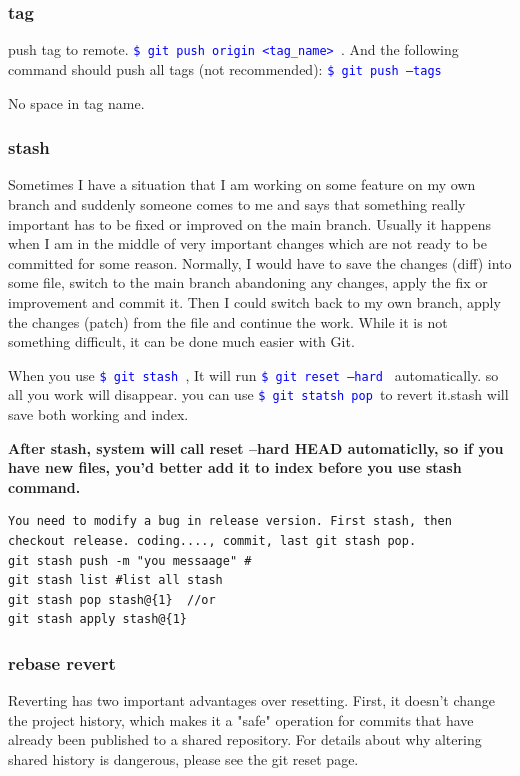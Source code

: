 \documentclass[paper=8.5in:11in, twoside, 12pt, pagesize=pdftex]{book}
\newcommand{\linuxcommand}[1]{\texttt{\textcolor{blue}{\$ #1 \Pisymbol{psy}{191}}}}
\begin{document}
\subsubsection{tag}
push tag to remote. \linuxcommand{git push origin <tag\_name>}. And the following command should push all tags (not recommended): \linuxcommand{git push --tags}

No space in tag name.
\subsubsection{stash}

	Sometimes I have a situation that I am working on some feature on my own branch and suddenly someone comes to me and says that something really important has to be fixed or improved on the main branch. Usually it happens when I am in the middle of very important changes which are not ready to be committed for some reason. Normally, I would have to save the changes (diff) into some file, switch to the main branch abandoning any changes, apply the fix or improvement and commit it. Then I could switch back to my own branch, apply the changes (patch) from the file and continue the work. While it is not something difficult, it can be done much easier with Git.
	
	When you use \linuxcommand{git stash}, It will run \linuxcommand{git reset --hard} automatically. so all you work will disappear. you can use \linuxcommand{git statsh pop }to revert it.stash will save both working and index.
	
	\textbf{After stash, system will call reset --hard HEAD automaticlly, so if you have new files, you'd better add it to index before you use stash command.}
\begin{lstlisting}
You need to modify a bug in release version. First stash, then checkout release. coding...., commit, last git stash pop.
git stash push -m "you messaage" #
git stash list #list all stash
git stash pop stash@{1}  //or
git stash apply stash@{1} 		
\end{lstlisting}
	
\subsubsection{rebase revert}
	
	Reverting has two important advantages over resetting. First, it doesn't change the project history, which makes it a "safe" operation for commits that have already been published to a shared repository. For details about why altering shared history is dangerous, please see the git reset page.
	
\end{document}
